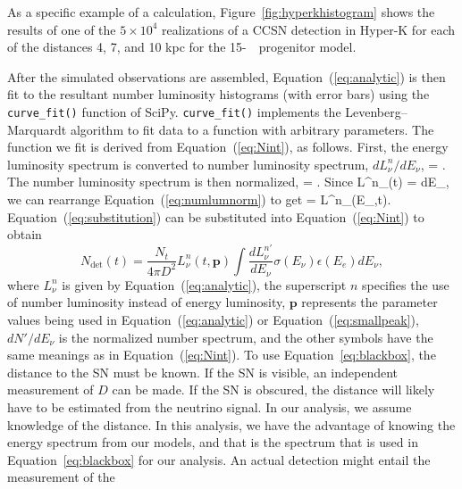 As a specific example of a calculation, 
Figure~\ref{fig:hyperkhistogram} shows the results of one of the $5\times10^4$
realizations of a CCSN detection in Hyper-K for each of the distances 4, 7, and
10 kpc for the 15-\Msol\ \ls\ progenitor model. 


After the simulated observations are assembled, 
Equation~(\ref{eq:analytic}) is
then fit to the resultant number luminosity histograms (with error bars)
using the \texttt{curve\_fit()} function
of SciPy.  
\texttt{curve\_fit()} implements
the Levenberg--Marquardt algorithm to fit data to a function with arbitrary
parameters.  The function we fit is derived from 
Equation~(\ref{eq:Nint}), as follows.  First, the energy luminosity spectrum is
converted to number luminosity spectrum, $dL^{n}_{\nu}/dE_\nu$,
\beq
{} = .
\eeq
The number luminosity spectrum is then normalized,
\beq
\label{eq:numlumnorm}
 = .
\eeq
Since
\beq
L^n_\nu(t) = \int {} dE_\nu,
\eeq
we can rearrange Equation~(\ref{eq:numlumnorm}) to get
\beq
\label{eq:substitution}
 = L^n_\nu(E_\nu,t).
\eeq
 Equation~(\ref{eq:substitution}) can be substituted into 
Equation~(\ref{eq:Nint}) to obtain
\begin{equation}
\label{eq:blackbox}
N_{\textrm{det}}(t) =  \frac{N_{t}}{4\pi D^2}
L^n_\nu(t,\boldsymbol{p})
\int 
\frac{dL^{n \prime}_{\nu}}{dE_{\nu}}\sigma(E_\nu)\epsilon(E_e)dE_\nu,
\end{equation}
where $L^n_\nu$ is given by
Equation~(\ref{eq:analytic}), the superscript $n$
specifies the use of number luminosity instead of energy luminosity, 
$\boldsymbol{p}$ represents the parameter values being used in 
Equation~(\ref{eq:analytic}) or Equation~(\ref{eq:smallpeak}), $dN'/dE_\nu$ is the
normalized number spectrum, and the other symbols have the same
meanings as in Equation~(\ref{eq:Nint}). To use
Equation~\ref{eq:blackbox}, the distance to the SN must be
known.  If the SN is visible, an independent measurement of $D$
can be made.  If the SN is obscured, the distance will likely
have to be estimated from the neutrino signal.  In our analysis, we
assume knowledge of the distance. In this analysis, we have the
advantage of knowing the energy spectrum from our models, and that is
the spectrum that is used in Equation~\ref{eq:blackbox} for our
analysis.  An actual detection might entail the measurement of the
